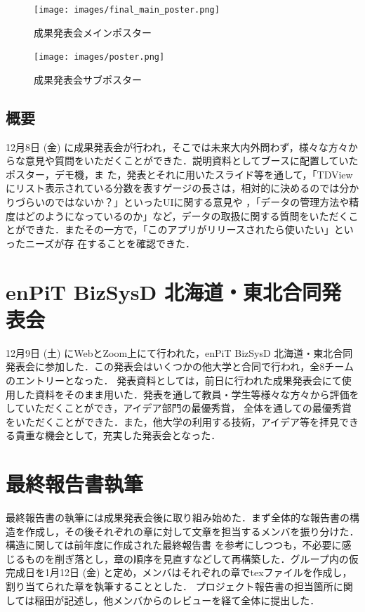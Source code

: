 \begin{figure}[H]
    \centering
    \texttt{[image: images/final\_main\_poster.png]}
    \caption{成果発表会メインポスター}
    \label{fig:final_main_poster}
\end{figure}

\begin{figure}[H]
    \centering
    \texttt{[image: images/poster.png]}
    \caption{成果発表会サブポスター}
    \label{fig:poster}
\end{figure}


\subsection{概要}
12月8日 (金) に成果発表会が行われ，そこでは未来大内外問わず，様々な方々からな意見や質問をいただくことができた．説明資料としてブースに配置していたポスター，デモ機，ま
た，発表とそれに用いたスライド等を通して，「TDViewにリスト表示されている分数を表すゲージの長さは，相対的に決めるのでは分かりづらいのではないか？」といったUIに関する意見や
，「データの管理方法や精度はどのようになっているのか」など，データの取扱に関する質問をいただくことができた．またその一方で，「このアプリがリリースされたら使いたい」といったニーズが存
在することを確認できた．

\section{enPiT BizSysD 北海道・東北合同発表会}
12月9日 (土) にWebとZoom上にて行われた，enPiT BizSysD 北海道・東北合同発表会に参加した．この発表会はいくつかの他大学と合同で行われ，全8チームのエントリーとなった．
発表資料としては，前日に行われた成果発表会にて使用した資料をそのまま用いた．発表を通して教員・学生等様々な方々から評価をしていただくことができ，アイデア部門の最優秀賞，
全体を通しての最優秀賞をいただくことができた．また，他大学の利用する技術，アイデア等を拝見できる貴重な機会として，充実した発表会となった．

\section{最終報告書執筆}
最終報告書の執筆には成果発表会後に取り組み始めた．まず全体的な報告書の構造を作成し，その後それぞれの章に対して文章を担当するメンバを振り分けた．構造に関しては前年度に作成された最終報告書
を参考にしつつも，不必要に感じるものを削ぎ落とし，章の順序を見直すなどして再構築した．グループ内の仮完成日を1月12日 (金) と定め，メンバはそれぞれの章でtexファイルを作成し，割り当てられた章を執筆することとした．
プロジェクト報告書の担当箇所に関しては稲田が記述し，他メンバからのレビューを経て全体に提出した．
